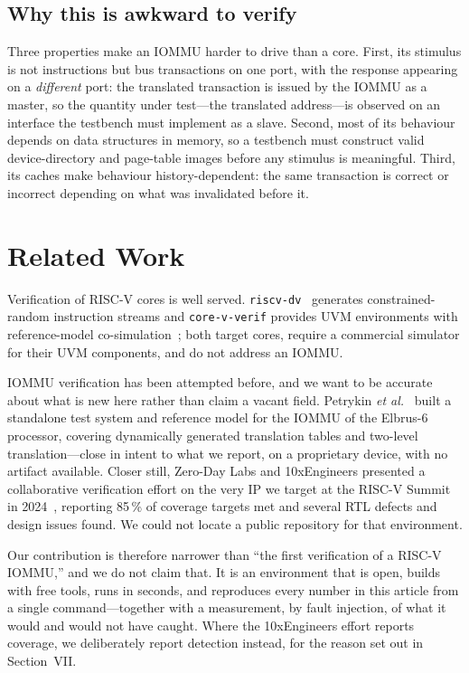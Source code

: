 \documentclass[journal]{IEEEtran}
\begin{document}
\subsection{Why this is awkward to verify}
Three properties make an IOMMU harder to drive than a core. First, its stimulus
is not instructions but bus transactions on one port, with the response
appearing on a \emph{different} port: the translated transaction is issued by the
IOMMU as a master, so the quantity under test---the translated address---is
observed on an interface the testbench must implement as a slave. Second, most
of its behaviour depends on data structures in memory, so a testbench must
construct valid device-directory and page-table images before any stimulus is
meaningful. Third, its caches make behaviour history-dependent: the same
transaction is correct or incorrect depending on what was invalidated before it.

\section{Related Work}
Verification of RISC-V cores is well served. \texttt{riscv-dv}~\cite{riscvdv}
generates constrained-random instruction streams and \texttt{core-v-verif}
provides UVM environments with reference-model co-simulation~\cite{corevverif};
both target cores, require a commercial simulator for their UVM components, and
do not address an IOMMU.

IOMMU verification has been attempted before, and we want to be accurate about
what is new here rather than claim a vacant field. Petrykin \emph{et
al.}~\cite{elbrus} built a standalone test system and reference model for the
IOMMU of the Elbrus-6 processor, covering dynamically generated translation
tables and two-level translation---close in intent to what we report, on a
proprietary device, with no artifact available. Closer still, Zero-Day Labs and
10xEngineers presented a collaborative verification effort on the very IP we
target at the RISC-V Summit in 2024~\cite{zdl10x}, reporting 85\,\% of coverage
targets met and several RTL defects and design issues found. We could not locate
a public repository for that environment.

Our contribution is therefore narrower than ``the first verification of a RISC-V
IOMMU,'' and we do not claim that. It is an environment that is open, builds
with free tools, runs in seconds, and reproduces every number in this article
from a single command---together with a measurement, by fault injection, of what
it would and would not have caught. Where the 10xEngineers effort reports
coverage, we deliberately report detection instead, for the reason set out in
Section~VII.
\end{document}
